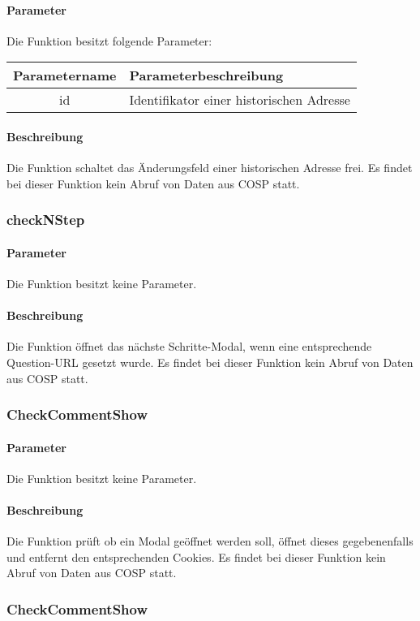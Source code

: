 \paragraph{Parameter} Die Funktion besitzt folgende Parameter:
\begin{table}[H]
	\begin{tabular}{|c|p{11cm}|}
		\hline
		\textbf{Parametername} & \textbf{Parameterbeschreibung} \\ \hline
		id & Identifikator einer historischen Adresse \\ \hline
	\end{tabular}
\end{table}
\paragraph{Beschreibung} Die Funktion schaltet das Änderungsfeld einer historischen Adresse frei. Es findet bei dieser Funktion kein Abruf von Daten aus {\glqq COSP\grqq} statt.
\subsubsection{checkNStep}
\paragraph{Parameter} Die Funktion besitzt keine Parameter.
\paragraph{Beschreibung} Die Funktion öffnet das {\glqq nächste Schritte\grqq}-Modal, wenn eine entsprechende Question-URL gesetzt wurde. Es findet bei dieser Funktion kein Abruf von Daten aus {\glqq COSP\grqq} statt.
\subsubsection{CheckCommentShow}
\paragraph{Parameter} Die Funktion besitzt keine Parameter.
\paragraph{Beschreibung} Die Funktion prüft ob ein Modal geöffnet werden soll, öffnet dieses gegebenenfalls und entfernt den entsprechenden Cookies. Es findet bei dieser Funktion kein Abruf von Daten aus {\glqq COSP\grqq} statt.
\subsubsection{CheckCommentShow}
